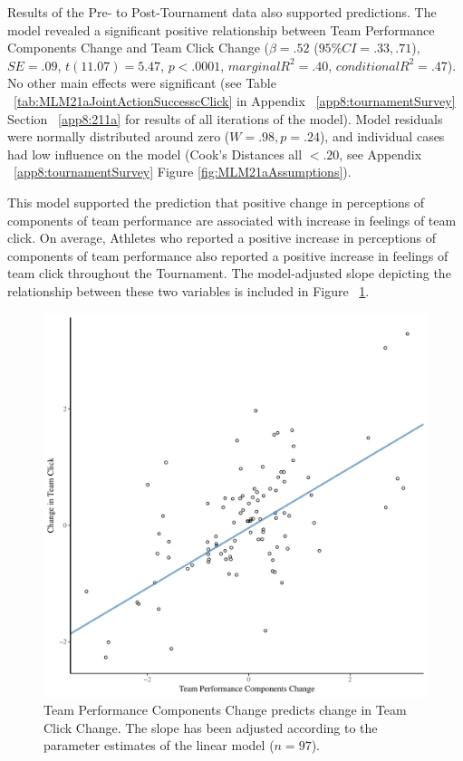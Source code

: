 \begin{CJK}{UTF8}{gbsn}
Results of the Pre- to Post-Tournament data also supported predictions.  The model revealed a significant positive relationship between Team Performance Components Change and Team Click Change ($\beta = .52$ ($95\% CI =  .33, .71$), $SE = .09$, $t(11.07) = 5.47$, $p < .0001$, $marginal R^2 = .40$, $conditional R^2 = .47$).  No other main effects were significant (see Table ~\ref{tab:MLM21aJointActionSuccesscClick} in Appendix ~\ref{app8:tournamentSurvey} Section ~\ref{app8:211a} for results of all iterations of the model).  Model residuals were normally distributed around zero ($W = .98, p = .24$), and individual cases had low influence on the model (Cook's Distances all  $< .20 $, see Appendix ~\ref{app8:tournamentSurvey} Figure \ref{fig:MLM21aAssumptions}).

This model supported the prediction that positive change in perceptions of components of team performance are associated with increase in feelings of team click.  On average, Athletes who reported a positive increase in perceptions of components of team performance also reported a positive increase in feelings of team click throughout the Tournament.  The model-adjusted slope depicting the relationship between these two variables is included in Figure ~\ref{fig:jasClickDeltaModelSLope}.

\begin{figure}[htbp]
  \centering
\includegraphics[scale=.5]{images/jasClickDeltaModelSlope}
  \caption{Team Performance Components Change predicts change in Team Click Change. The slope has been adjusted according to the parameter estimates of the linear model ($n = 97$).}
  \label{fig:jasClickDeltaModelSLope}
\end{figure}


\end{CJK}
